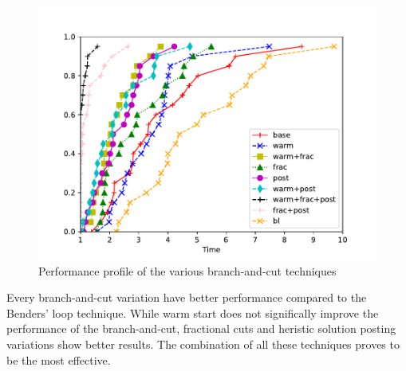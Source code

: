 \documentclass{article}
\begin{document}
\begin{figure}[ht]
        \caption{Performance profile of the various branch-and-cut techniques}
        \label{fig:ht_bec}
        \centering
        \includegraphics[width=340pt]{assets/ht_bec.pdf}
\end{figure}

Every branch-and-cut variation have better performance compared to the Benders'
loop technique. While warm start does not significally improve the performance of the
branch-and-cut, fractional cuts and heristic solution posting variations show better results.
The combination of all these techniques proves to be the most effective.

\clearpage
\newpage



\end{document}
